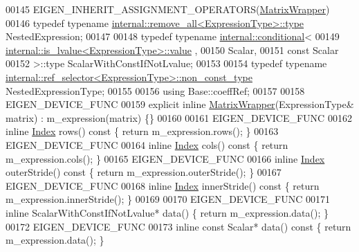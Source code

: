 \begin{DoxyCode}
00145     EIGEN\_INHERIT\_ASSIGNMENT\_OPERATORS(\hyperlink{group___core___module_class_eigen_1_1_matrix_wrapper}{MatrixWrapper})
00146     \textcolor{keyword}{typedef} \textcolor{keyword}{typename} \hyperlink{group___sparse_core___module}{internal::remove\_all<ExpressionType>::type} 
      NestedExpression;
00147 
00148     \textcolor{keyword}{typedef} \textcolor{keyword}{typename} \hyperlink{struct_eigen_1_1internal_1_1conditional}{internal::conditional}<
00149                        \hyperlink{struct_eigen_1_1internal_1_1is__lvalue}{internal::is\_lvalue<ExpressionType>::value}
      ,
00150                        Scalar,
00151                        \textcolor{keyword}{const} Scalar
00152                      >::type ScalarWithConstIfNotLvalue;
00153 
00154     \textcolor{keyword}{typedef} \textcolor{keyword}{typename} \hyperlink{class_eigen_1_1internal_1_1_tensor_lazy_evaluator_writable}{internal::ref\_selector<ExpressionType>::non\_const\_type}
       NestedExpressionType;
00155 
00156     \textcolor{keyword}{using} Base::coeffRef;
00157 
00158     EIGEN\_DEVICE\_FUNC
00159     \textcolor{keyword}{explicit} \textcolor{keyword}{inline} \hyperlink{group___core___module_class_eigen_1_1_matrix_wrapper}{MatrixWrapper}(ExpressionType& matrix) : m\_expression(matrix) \{\}
00160 
00161     EIGEN\_DEVICE\_FUNC
00162     \textcolor{keyword}{inline} \hyperlink{namespace_eigen_a62e77e0933482dafde8fe197d9a2cfde}{Index} rows()\textcolor{keyword}{ const }\{ \textcolor{keywordflow}{return} m\_expression.rows(); \}
00163     EIGEN\_DEVICE\_FUNC
00164     \textcolor{keyword}{inline} \hyperlink{namespace_eigen_a62e77e0933482dafde8fe197d9a2cfde}{Index} cols()\textcolor{keyword}{ const }\{ \textcolor{keywordflow}{return} m\_expression.cols(); \}
00165     EIGEN\_DEVICE\_FUNC
00166     \textcolor{keyword}{inline} \hyperlink{namespace_eigen_a62e77e0933482dafde8fe197d9a2cfde}{Index} outerStride()\textcolor{keyword}{ const }\{ \textcolor{keywordflow}{return} m\_expression.outerStride(); \}
00167     EIGEN\_DEVICE\_FUNC
00168     \textcolor{keyword}{inline} \hyperlink{namespace_eigen_a62e77e0933482dafde8fe197d9a2cfde}{Index} innerStride()\textcolor{keyword}{ const }\{ \textcolor{keywordflow}{return} m\_expression.innerStride(); \}
00169 
00170     EIGEN\_DEVICE\_FUNC
00171     \textcolor{keyword}{inline} ScalarWithConstIfNotLvalue* data() \{ \textcolor{keywordflow}{return} m\_expression.data(); \}
00172     EIGEN\_DEVICE\_FUNC
00173     \textcolor{keyword}{inline} \textcolor{keyword}{const} Scalar* data()\textcolor{keyword}{ const }\{ \textcolor{keywordflow}{return} m\_expression.data(); \}

\end{DoxyCode}
